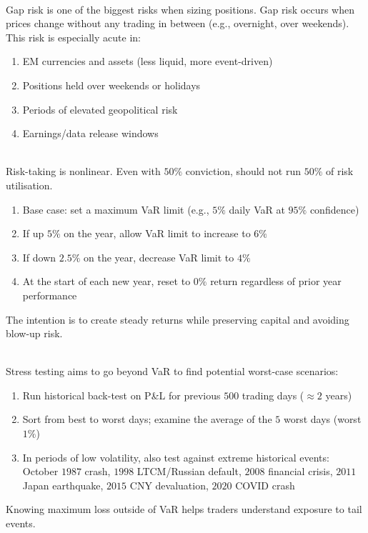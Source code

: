 \documentclass[a4paper,oneside,openany]{book}
\begin{document}
\begin{remark} \\
Gap risk is one of the biggest risks when sizing positions. Gap risk occurs when prices change without any trading in between (e.g., overnight, over weekends). This risk is especially acute in:
\begin{enumerate}[label=\roman*.]
\setlength{\itemsep}{0pt}
\item EM currencies and assets (less liquid, more event-driven)
\item Positions held over weekends or holidays
\item Periods of elevated geopolitical risk
\item Earnings/data release windows
\end{enumerate}
\end{remark}

\begin{remark} \\
Risk-taking is nonlinear. Even with $50\%$ conviction, should not run $50\%$ of risk utilisation.
\begin{enumerate}[label=\roman*.]
\setlength{\itemsep}{0pt}
\item Base case: set a maximum VaR limit (e.g., $5\%$ daily VaR at $95\%$ confidence)
\item If up $5\% $ on the year, allow VaR limit to increase to $6\%$ 
\item If down $2.5\%$ on the year, decrease VaR limit to $4\%$
\item At the start of each new year, reset to $0\%$ return regardless of prior year performance
\end{enumerate}
The intention is to create steady returns while preserving capital and avoiding blow-up risk.
\end{remark}

\begin{remark} \\
Stress testing aims to go beyond VaR to find potential worst-case scenarios:
\begin{enumerate}[label=\roman*.]
\setlength{\itemsep}{0pt}
\item Run historical back-test on P\&L for previous $500$ trading days ($\approx 2$ years)
\item Sort from best to worst days; examine the average of the $5$ worst days (worst $1\%$)
\item In periods of low volatility, also test against extreme historical events: October $1987$ crash, $1998$ LTCM/Russian default, $2008$ financial crisis, $2011$ Japan earthquake, $2015$ CNY devaluation, $2020$ COVID crash
\end{enumerate}
Knowing maximum loss outside of VaR helps traders understand exposure to tail events.
\end{remark}
\end{document}
